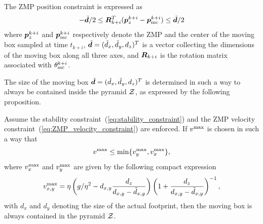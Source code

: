 The ZMP position constraint is expressed as
\begin{equation}\label{eq:ZMP_constraint}
-\tilde{{\bm{d}}} /2 \le {\bm{R}}_{k+i}^T({\bm{p}}_z^{k+i} - {\bm{p}}_{\rm mc}^{k+i}) \le \tilde{{\bm{d}}} /2
\end{equation}
where ${\bm{p}}_z^{k+i}$ and ${\bm{p}}_{\rm mc}^{k+i}$ respectively denote the ZMP and the center of the moving box sampled at time $t_{k+i}$, $\tilde {{\bm{d}}} = (\tilde d_x, \tilde d_y, d_z)^T$
is a vector collecting the dimensions of the moving box along all three axes, and ${\bm{R}}_{k+i}$ is the rotation matrix associated with $\theta_{\rm mc}^{k+i}$.

The size of the moving box $\tilde {{\bm{d}}} = (\tilde d_x, \tilde d_y, d_z)^T$ is determined in such a way to always be contained inside the pyramid $\cal Z$, as expressed by the following proposition.

\medskip

\begin{proposition}
Assume the stability constraint~(\ref{eq:stability_constraint}) and the ZMP velocity constraint~(\ref{eq:ZMP_velocity_constraint}) are enforced. If $v^{\rm max}$ is chosen in such a way that
\begin{equation}
v^{\rm max} \le \min \{v_y^{\rm max},v_x^{\rm max}\},
\end{equation}
where $v_x^{\rm max}$ and $v_y^{\rm max}$ are given by the following compact expression
\begin{equation}\label{eq:conservative_condition}
v_{x,y}^{\rm max} = \eta\left(g/\eta^2 - d_{x,y}\frac{d_z}{d_{x,y} - \tilde d_{x,y}}\right)\left(1 + \frac{d_z}{d_{x,y} - \tilde d_{x,y}}\right)^{-1},
\end{equation}
with $d_x$ and $d_y$ denoting the size of the actual footprint, then the moving box is always contained in the pyramid $\cal Z$.
\label{prop:conservative-box}
\end{proposition}

\medskip

